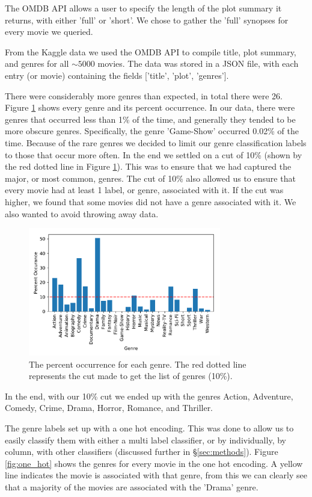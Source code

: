 \documentclass[11pt]{article}
\begin{document}
The OMDB API allows a user to specify the length of the plot summary it returns, with either 'full' or 'short'. We chose to gather the 'full' synopses for every movie we queried.

From the Kaggle data we used the OMDB API to compile title, plot summary, and genres for all $\sim5000$ movies. The data was stored in a JSON file, with each entry (or movie) containing the fields ['title', 'plot', 'genres'].

There were considerably more genres than expected, in total there were 26. Figure \ref{fig:genres} shows every genre and its percent occurrence. In our data, there were genres that occurred less than 1\% of the time, and generally they tended to be more obscure genres. Specifically, the genre 'Game-Show' occurred 0.02\% of the time. Because of the rare genres we decided to limit our genre classification labels to those that occur more often. In the end we settled on a cut of 10\% (shown by the red dotted line in Figure \ref{fig:genres}). This was to ensure that we had captured the major, or most common, genres. The cut of 10\% also allowed us to ensure that every movie had at least 1 label, or genre, associated with it. If the cut was higher, we found that some movies did not have a genre associated with it. We also wanted to avoid throwing away data. 

\begin{figure}[ht]
	\centering
		\includegraphics[width=0.75\textwidth]{genres.pdf}
	\caption{The percent occurrence for each genre. The red dotted line represents the cut made to get the list of genres (10\%).}
	\label{fig:genres}
\end{figure}

In the end, with our 10\% cut we ended up with the genres Action, Adventure, Comedy, Crime, Drama, Horror, Romance, and Thriller.

The genre labels set up with a one hot encoding. This was done to allow us to easily classify them with either a multi label classifier, or by individually, by column, with other classifiers (discussed further in \S \ref{sec:methods}). Figure \ref{fig:one_hot} shows the genres for every movie in the one hot encoding. A yellow line indicates the movie is associated with that genre, from this we can clearly see that a majority of the movies are associated with the 'Drama' genre.
\end{document}
